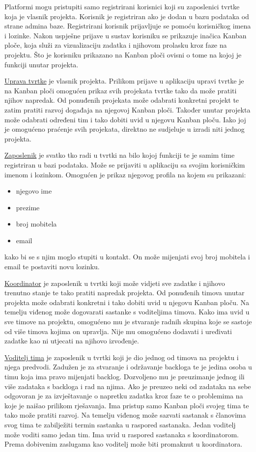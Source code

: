 \par Platformi mogu pristupiti samo registrirani korisnici koji su zaposlenici tvrtke koja je vlasnik projekta. Korisnik je registriran ako je dodan u bazu podataka od strane admina baze. Registrirani korisnik prijavljuje se pomoću korisničkog imena i lozinke. Nakon uspješne prijave u sustav korisniku se prikazuje inačica Kanban ploče, koja služi za vizualizaciju zadatka i njihovom prolasku kroz faze na projektu. Što je korisniku prikazano na Kanban ploči ovisni o tome na kojoj je funkciji unutar projekta.
\par \underline{Uprava tvrtke} je vlasnik projekta. Prilikom prijave u aplikaciju upravi tvrtke je na Kanban ploči omogućen prikaz svih projekata tvrtke tako da može pratiti njihov napredak. Od ponuđenih projekata može odabrati konkretni projekt te zatim pratiti razvoj događaja na njegovoj Kanban ploči. Također unutar projekta može odabrati određeni tim i tako dobiti uvid u njegovu Kanban ploču. Iako joj je omogućeno praćenje svih projekata, direktno ne sudjeluje u izradi niti jednog projekta.
\par \underline{Zaposlenik} je svatko tko radi u tvrtki na bilo kojoj funkciji te je samim time registriran u bazi podataka. Može se prijaviti u aplikaciju sa svojim korisničkim imenom i lozinkom. Omogućen je prikaz njegovog profila na kojem su prikazani:
\begin{itemize}
			\item njegovo ime
			\item prezime
			\item broj mobitela
			\item email
		
		\end{itemize}
kako bi se s njim moglo stupiti u kontakt. On može mijenjati svoj broj mobitela i email te postaviti novu lozinku.
\par \underline{Koordinator} je zaposlenik u tvrtki koji može vidjeti sve zadatke i njihovo trenutno stanje te tako pratiti napredak projekta. Od ponuđenih timova unutar projekta može odabrati konkretni i tako dobiti uvid u njegovu Kanban ploču. Na temelju viđenog može dogovarati sastanke s voditeljima timova. Kako ima uvid u sve timove na projektu, omogućeno mu je stvaranje radnih skupina koje se sastoje od više timova kojima on upravlja. Nije mu omogućeno dodavati i uređivati zadatke kao ni utjecati na njihovo izvođenje. 
\par \underline{Voditelj tima} je zaposlenik u tvrtki koji je dio jednog od timova na projektu i njega predvodi. Zadužen je za stvaranje i održavanje backloga te je jedina osoba u timu koja ima pravo mijenjati backlog. Dozvoljeno mu je preuzimanje jednog ili više zadataka s backloga i rad na njima. Ako je preuzeo neki od zadataka na sebe odgovoran je za izvještavanje o napretku zadatka kroz faze te o problemima na koje je naišao prilikom rješavanja. Ima pristup samo Kanban ploči svojeg tima te tako može pratiti razvoj. Na temelju viđenog može sazvati sastanak s članovima svog tima te zabilježiti termin sastanka u raspored sastanaka. Jedan voditelj može voditi samo jedan tim. Ima uvid u raspored sastanaka s koordinatorom. Prema dobivenim zaslugama kao voditelj može biti promaknut u koordinatora. 
